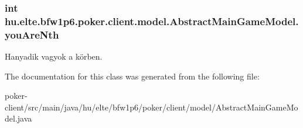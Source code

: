 \subsubsection[{you\+Are\+Nth}]{\setlength{\rightskip}{0pt plus 5cm}int hu.\+elte.\+bfw1p6.\+poker.\+client.\+model.\+Abstract\+Main\+Game\+Model.\+you\+Are\+Nth\hspace{0.3cm}{\ttfamily [protected]}}\label{classhu_1_1elte_1_1bfw1p6_1_1poker_1_1client_1_1model_1_1_abstract_main_game_model_acdec9afb7f6be033570ccd2be4d18482}
Hanyadik vagyok a körben. 

The documentation for this class was generated from the following file\+:\begin{DoxyCompactItemize}
\item 
poker-\/client/src/main/java/hu/elte/bfw1p6/poker/client/model/Abstract\+Main\+Game\+Model.\+java\end{DoxyCompactItemize}
